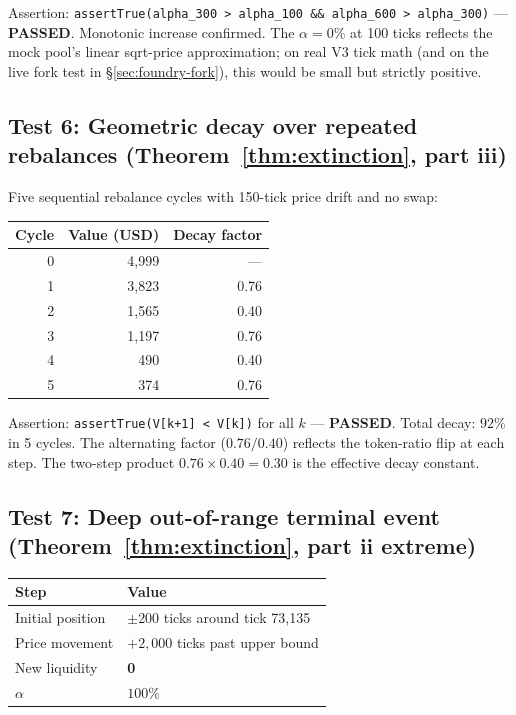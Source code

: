 \documentclass[11pt,a4paper]{article}
\begin{document}
Assertion: \texttt{assertTrue(alpha\_300 > alpha\_100 \&\& alpha\_600 > alpha\_300)} --- \textbf{PASSED}. Monotonic increase confirmed. The $\alpha = 0\%$ at 100 ticks reflects the mock pool's linear sqrt-price approximation; on real V3 tick math (and on the live fork test in \S\ref{sec:foundry-fork}), this would be small but strictly positive.

\subsection{Test 6: Geometric decay over repeated rebalances (Theorem~\ref{thm:extinction}, part iii)}\label{sec:foundry-decay}

Five sequential rebalance cycles with 150-tick price drift and no swap:

\begin{table}[H]
\centering
\begin{tabular}{@{}rrr@{}}
\toprule
Cycle & Value (USD) & Decay factor \\
\midrule
0 & 4{,}999 & --- \\
1 & 3{,}823 & 0.76 \\
2 & 1{,}565 & 0.40 \\
3 & 1{,}197 & 0.76 \\
4 & 490     & 0.40 \\
5 & 374     & 0.76 \\
\bottomrule
\end{tabular}
\end{table}

Assertion: \texttt{assertTrue(V[k+1] < V[k])} for all $k$ --- \textbf{PASSED}. Total decay: $92\%$ in 5 cycles. The alternating factor ($0.76 / 0.40$) reflects the token-ratio flip at each step. The two-step product $0.76 \times 0.40 = 0.30$ is the effective decay constant.

\subsection{Test 7: Deep out-of-range terminal event (Theorem~\ref{thm:extinction}, part ii extreme)}\label{sec:foundry-terminal}

\begin{table}[H]
\centering
\begin{tabular}{@{}ll@{}}
\toprule
Step & Value \\
\midrule
Initial position & $\pm 200$ ticks around tick 73{,}135 \\
Price movement   & $+2{,}000$ ticks past upper bound \\
New liquidity    & \textbf{0} \\
\textbf{$\alpha$} & \textbf{$100\%$} \\
\bottomrule
\end{tabular}
\end{table}
\end{document}
